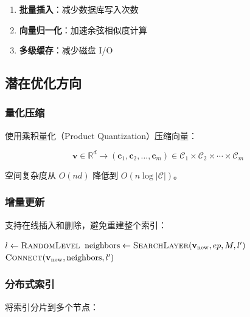 \documentclass[12pt,a4paper]{article}
\begin{document}
\begin{enumerate}
    \item \textbf{批量插入}：减少数据库写入次数
    \item \textbf{向量归一化}：加速余弦相似度计算
    \item \textbf{多级缓存}：减少磁盘 I/O
\end{enumerate}

\subsection{潜在优化方向}

\subsubsection{量化压缩}

使用乘积量化（Product Quantization）压缩向量：

\begin{equation}
\mathbf{v} \in \mathbb{R}^d \rightarrow (\mathbf{c}_1, \mathbf{c}_2, \ldots, \mathbf{c}_m) \in \mathcal{C}_1 \times \mathcal{C}_2 \times \cdots \times \mathcal{C}_m
\end{equation}

空间复杂度从 $O(nd)$ 降低到 $O(n \log |\mathcal{C}|)$。

\subsubsection{增量更新}

支持在线插入和删除，避免重建整个索引：

\begin{algorithm}
\caption{增量插入}
\begin{algorithmic}[1]
    \State $l \gets \Call{RandomLevel}{}$
        \State $\text{neighbors} \gets \Call{SearchLayer}{\mathbf{v}_{\text{new}}, ep, M, l'}$
        \State $\Call{Connect}{\mathbf{v}_{\text{new}}, \text{neighbors}, l'}$
    \EndFor
\EndProcedure
\end{algorithmic}
\end{algorithm}

\subsubsection{分布式索引}

将索引分片到多个节点：
\end{document}
